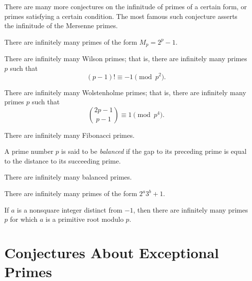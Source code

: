 There are many more conjectures on the infinitude of primes of a certain form, or primes satisfying a certain condition. The most famous such conjecture asserts the infinitude of the Mersenne primes.

\begin{conjecture}
  There are infinitely many primes of the form $M_p=2^p-1$.
\end{conjecture}

\begin{conjecture}
  There are infinitely many Wilson primes; that is, there are infinitely many primes $p$ such that
  \begin{equation*}
    (p-1)!\equiv -1\pmod{p^2}.
  \end{equation*}
\end{conjecture}

\begin{conjecture}
  There are infinitely many Wolstenholme primes; that is, there are infinitely many primes $p$ such that
  \begin{equation*}
    \binom{2p-1}{p-1} \equiv 1 \pmod{p^4}.
  \end{equation*}
\end{conjecture}

\begin{conjecture}
  There are infinitely many Fibonacci primes.
\end{conjecture}

A prime number $p$ is said to be \emph{balanced} if the gap to its preceding prime is equal to the distance to its succeeding prime.

\begin{conjecture}
  There are infinitely many balanced primes.
\end{conjecture}

\begin{conjecture}
  There are infinitely many primes of the form $2^a3^b+1$.
\end{conjecture}

\begin{conjecture}
  If $a$ is a nonsquare integer distinct from $-1$, then there are infinitely many primes $p$ for which $a$ is a primitive root modulo $p$.
\end{conjecture}

\section{Conjectures About Exceptional Primes}


